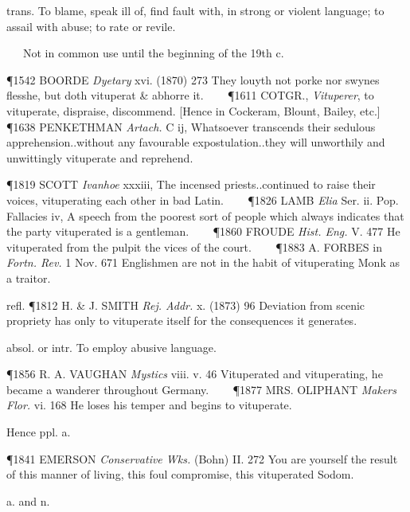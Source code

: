 \begin{description}[wide, labelwidth=!, labelindent=0pt]
\noindent trans. To blame, speak ill of, find fault with, in strong or violent language; to assail with abuse; to rate or revile.

   Not in common use until the beginning of the 19th c.

\P 1542 BOORDE  \textit{Dyetary} xvi. (1870) 273 They louyth not porke nor swynes flesshe, but doth vituperat \& abhorre it.    
\P 1611 COTGR.,  \textit{Vituperer}, to vituperate, dispraise, discommend. [Hence in Cockeram, Blount, Bailey, etc.]    
\P 1638 PENKETHMAN  \textit{Artach.} C ij, Whatsoever transcends their sedulous apprehension..without any favourable expostulation..they will unworthily and unwittingly vituperate and reprehend.

\P 1819 SCOTT  \textit{Ivanhoe} xxxiii, The incensed priests..continued to raise their voices, vituperating each other in bad Latin.    
\P 1826 LAMB  \textit{Elia} Ser. ii. Pop. Fallacies iv, A speech from the poorest sort of people which always indicates that the party vituperated is a gentleman.    
\P 1860 FROUDE  \textit{Hist. Eng.} V. 477 He vituperated from the pulpit the vices of the court.    
\P 1883 A. FORBES in  \textit{Fortn. Rev.} 1 Nov. 671 Englishmen are not in the habit of vituperating Monk as a traitor.

refl. \P 1812 H. \& J. SMITH  \textit{Rej. Addr.} x. (1873) 96 Deviation from scenic propriety has only to vituperate itself for the consequences it generates.

 absol. or intr. To employ abusive language.

\P 1856 R. A. VAUGHAN  \textit{Mystics} viii. v. 46 Vituperated and vituperating, he became a wanderer throughout Germany.    
\P 1877 MRS. OLIPHANT  \textit{Makers Flor.} vi. 168 He loses his temper and begins to vituperate.

\noindent Hence \textbf{} ppl. a.

\P 1841 EMERSON  \textit{Conservative Wks.} (Bohn) II. 272 You are yourself the result of this manner of living, this foul compromise, this vituperated Sodom.



 a. and n.

\noindent {}

\vspace{-0.3cm}


\end{description}
